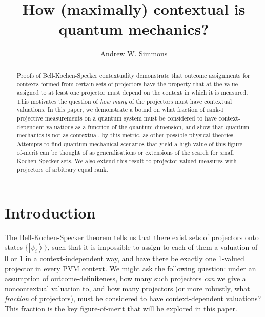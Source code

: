 \documentclass{article}
\theoremstyle{definition}
\newcommand{\ket}[1]{{\left\vert{#1}\right\rangle}}
\begin{document}
\title{How (maximally) contextual is quantum mechanics?}
\author{Andrew W. Simmons}
\address{Department of Physics, Imperial College London, SW7 2AZ.}
\begin{abstract}
Proofs of Bell-Kochen-Specker contextuality demonstrate that outcome assignments for contexts formed from certain sets of projectors have the property that at the value assigned to at least one projector must depend on the context in which it is measured. This motivates the question of \emph{how many} of the projectors must have contextual valuations. In this paper, we demonstrate a bound on what fraction of rank-1 projective measurements on a quantum system must be considered to have context-dependent valuations as a function of the quantum dimension, and show that quantum mechanics is not as contextual, by this metric, as other possible physical theories. Attempts to find quantum mechanical scenarios that yield a high value of this figure-of-merit can be thought of as generalisations or extensions of the search for small Kochen-Specker sets. We also extend this result to projector-valued-measures with projectors of arbitrary equal rank.\end{abstract}
\maketitle{}

\section{Introduction}

The Bell-Kochen-Specker theorem tells us that there exist sets of projectors onto states $\{\ket{\psi_i}\}$, such that it is impossible to assign to each of them a valuation of 0 or 1 in a context-independent way, and have there be exactly one 1-valued projector in every PVM context. We might ask the following question: under an assumption of outcome-definiteness, how many such projectors \emph{can} we give a noncontextual valuation to, and how many projectors (or more robustly, what \emph{fraction} of projectors), must be considered to have context-dependent valuations? This fraction is the key figure-of-merit that will be explored in this paper.
\end{document}
